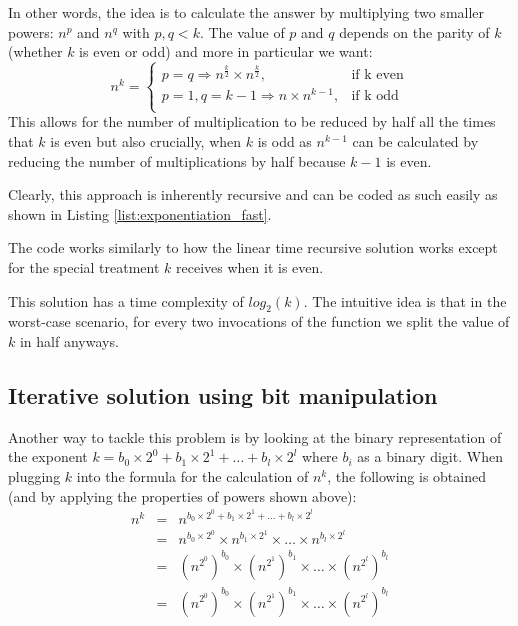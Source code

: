 In other words, the idea is to calculate the answer by multiplying two smaller powers: $n^p$ and $n^q$ with $p,q < k$. The value of $p$ and $q$ depends on the parity of $k$ (whether $k$ is even or odd) and more in particular we want:
  \[
    n^k = \begin{cases}
                p=q \Longrightarrow n^{\frac{k}{2}} \times n^{\frac{k}{2}}, & \text{if  k even}\\
                p=1, q=k-1 \Longrightarrow n \times n^{k-1}, & \text{if k odd}\\
            \end{cases}
  \]
This allows for the number of multiplication to be reduced by half all the times that $k$ is even but also crucially, when $k$ is odd as $n^{k-1}$ can be calculated by reducing the number of multiplications by half because $k-1$ is even.

Clearly, this approach is inherently recursive and
can be coded as such easily as shown in Listing \ref{list:exponentiation_fast}.



The code works similarly to how the linear time recursive solution works except for the special treatment $k$ receives when it is even. 

This solution has a time complexity of $log_2(k)$. The intuitive idea is that in the worst-case scenario, for every two invocations of the  function we split the value of $k$ in half anyways.

\subsection{Iterative solution using bit manipulation}

Another way to tackle this problem is by looking at the binary representation of the exponent $k =
b_0 \times 2^0 + b_1 \times 2^1 + \ldots + b_l \times 2^l$ where $b_i$ as a binary digit.
When plugging $k$ into the formula for the calculation of $n^k$, the following is obtained (and by applying the properties of powers shown above):
\[
    \begin{array}{lcl}
        n^k & = &  n^{b_0 \times 2^0 + b_1 \times 2^1 + \ldots + b_l \times 2^l} \\
        & = & n^{b_0 \times 2^0} \times n^{b_1 \times 2^1} \times \ldots \times n^{b_l \times 2^l} \\
        & = & (n^{2^0})^{b_0} \times  (n^{2^1})^{b_1} \times \ldots \times (n^{2^l})^{b_l} \\
        & = & (n^{2^0})^{b_0} \times  (n^{2^1})^{b_1} \times \ldots \times (n^{2^l})^{b_l} 
    \end{array}
\]

